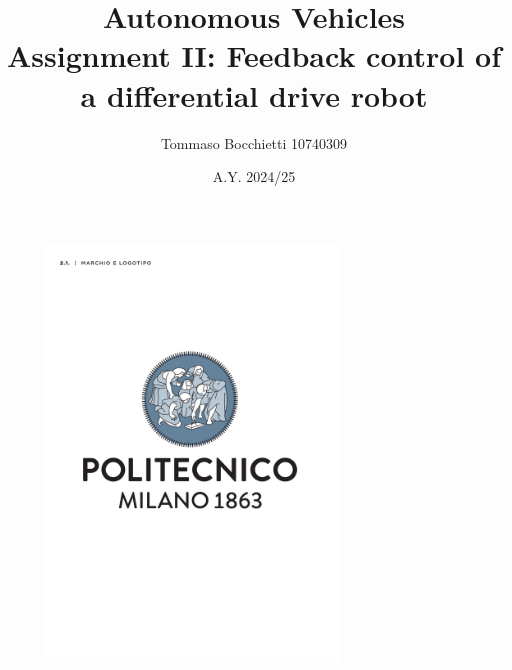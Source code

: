 \documentclass{assignment}
\begin{document}
\title{Autonomous Vehicles \\ Assignment II: Feedback control of a differential drive robot}
\author{Tommaso Bocchietti 10740309}
\date{A.Y. 2024/25}

\maketitle

\begin{figure}[H]
    \centering
    \includegraphics[width=0.7\textwidth]{./pdf/Polimi_logo_coverpage.pdf}
    \label{fig:Polimi_logo}
\end{figure}

\clearpage
\tableofcontents
\listoffigures

\clearpage






\vspace*{\fill}
\nocite{*}


\end{document}
